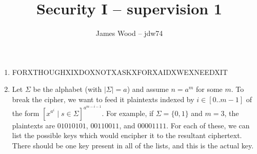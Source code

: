 \documentclass{article}
\begin{document}
\title{Security I -- supervision 1}
\author{James Wood -- jdw74}
\maketitle

\begin{enumerate}
  \item FORXTHOUGHXIXDOXNOTXASKXFORXAIDXWEXNEEDXIT
  \item
    Let $\Sigma$ be the alphabet (with $\lvert \Sigma \rvert = a$) and assume $n = a^m$ for some $m$. To break the cipher, we want to feed it plaintexts indexed by $i \in [0 \mathbin{..} m - 1]$ of the form $\left[x^{a^i} \mid s \in \Sigma\right]^{a^{m-i-1}}$. For example, if $\Sigma = \{0,1\}$ and $m = 3$, the plaintexts are $01010101$, $00110011$, and $00001111$. For each of these, we can list the possible keys which would encipher it to the resultant ciphertext. There should be one key present in all of the lists, and this is the actual key.


\end{enumerate}
\end{document}
